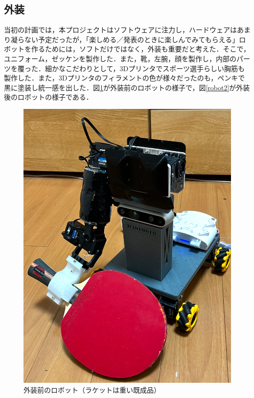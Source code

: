 \documentclass[10pt, oneside, titlepage]{ltjarticle}  %
\begin{document}
  \subsection{外装}
  当初の計画では，本プロジェクトはソフトウェアに注力し，ハードウェアはあまり凝らない予定だったが，「楽しめる／発表のときに楽しんでみてもらえる」ロボットを作るためには，ソフトだけではなく，外装も重要だと考えた．そこで，ユニフォーム，ゼッケンを製作した．また，靴，左腕，顔を製作し，内部のパーツを覆った．細かなこだわりとして，3Dプリンタでスポーツ選手らしい胸筋も製作した．また，3Dプリンタのフィラメントの色が様々だったのも，ペンキで黒に塗装し統一感を出した．図\ref{robot1}が外装前のロボットの様子で，図\ref{robot2}が外装後のロボットの様子である．
  \begin{figure}[H]
    \centering
    \begin{minipage}{0.48\textwidth}
      \centering
      \includegraphics[width=\textwidth]{figures/robot1.jpg}
      \caption{外装前のロボット（ラケットは重い既成品）}
      \label{robot1}

\end{minipage}
\end{figure}
\end{document}

